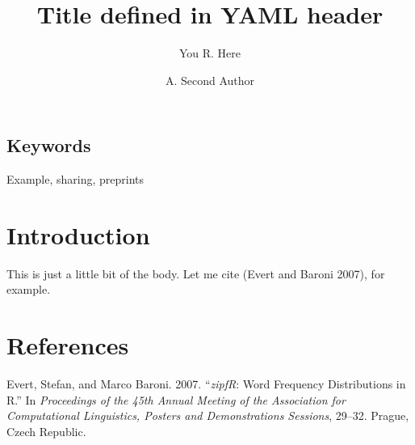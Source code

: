 \documentclass[fleqn,10pt]{wlpeerj}
\title{Title defined in YAML header}
\author[1]{You R. Here}
\affil[1]{Your Affiliation}
\author[2]{A. Second Author}
\affil[2]{University of Somewhere}
\begin{document}
\flushbottom
\thispagestyle{empty}
\maketitle

\subsection*{Keywords}\label{keywords}
Example, sharing, preprints

\rfoot{\small\sffamily\bfseries\thepage/\pageref{endmain}}
\hypertarget{introduction}{%
\section{Introduction}\label{introduction}}

This is just a little bit of the body. Let me cite (Evert and Baroni
2007), for example.

\hypertarget{references}{%
\section*{References}\label{references}}

\hypertarget{refs}{}
\leavevmode\hypertarget{ref-zipfR}{}%
Evert, Stefan, and Marco Baroni. 2007. ``\emph{zipfR}: Word Frequency
Distributions in R.'' In \emph{Proceedings of the 45th Annual Meeting of
the Association for Computational Linguistics, Posters and
Demonstrations Sessions}, 29--32. Prague, Czech Republic.
\end{document}

